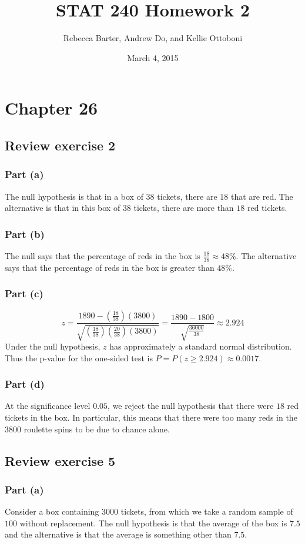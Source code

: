 \documentclass[11pt]{article}
\title{STAT 240 Homework 2}
\author{Rebecca Barter, Andrew Do, and Kellie Ottoboni}
\date{March 4, 2015} %
\begin{document}
\maketitle


\section*{Chapter 26}
\subsection*{Review exercise 2} %
\subsubsection*{Part (a)}
The null hypothesis is that in a box of $38$ tickets, there are $18$ that are red.  The alternative is that in this box of $38$ tickets, there are more than $18$ red tickets.
\subsubsection*{Part (b)}
The null says that the percentage of reds in the box is $\frac{18}{38}\approx 48\%$.  The alternative says that the percentage of reds in the box is greater than $48\%$.
\subsubsection*{Part (c)}
$$z = \frac{1890 - (\frac{18}{38})(3800)}{\sqrt{ (\frac{18}{38}) (\frac{20}{38})(3800)}} = \frac{1890 - 1800}{\sqrt{\frac{36000}{38}}} \approx 2.924$$
Under the null hypothesis, $z$ has approximately a standard normal distribution.  Thus the p-value for the one-sided test is $P = P(z \geq 2.924) \approx 0.0017$.  
\subsubsection*{Part (d)}
At the significance level $0.05$, we reject the null hypothesis that there were $18$ red tickets in the box.  In particular, this means that there were too many reds in the $3800$ roulette spins to be due to chance alone.

\subsection*{Review exercise 5} %
\subsubsection*{Part (a)}
Consider a box containing $3000$ tickets, from which we take a random sample of $100$ without replacement.  The null hypothesis is that the average of the box is $7.5$ and the alternative is that the average is something other than $7.5$.
\end{document}
